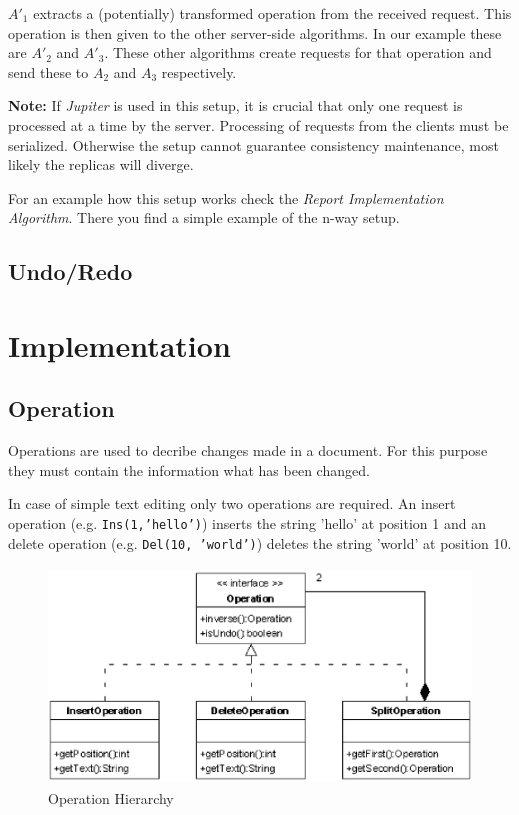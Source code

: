 $A'_1$ extracts a (potentially) transformed operation from the received 
request. This operation is then given to the other server-side algorithms. 
In our example these are $A'_2$ and $A'_3$. These other algorithms create
requests for that operation and send these to $A_2$ and $A_3$ respectively.

\textbf{Note:} If \emph{Jupiter} is used in this setup, it is crucial that
only one request is processed at a time by the server. Processing of
requests from the clients must be serialized. Otherwise the setup cannot
guarantee consistency maintenance, most likely the replicas will diverge.

For an example how this setup works check the 
\emph{Report Implementation Algorithm}. There you find a simple example
of the n-way setup.


\subsection{Undo/Redo}
\label{sect:algorithm.undoredo}
% 
%



\section{Implementation}


\subsection{Operation}
Operations are used to decribe changes made in a document. For this purpose they 
must contain the information what has been changed.

In case of simple text editing only two operations are required. An insert 
operation (e.g. \texttt{Ins(1,'hello')}) inserts the string 'hello' at position 
1 and an delete operation (e.g. \texttt{Del(10, 'world')}) deletes the string 
'world' at position 10.

\begin{figure}[H]
\centering
\includegraphics[height=5.74cm,width=11.59cm]{../images/finalreport/algorithm_operation.eps}
\caption{Operation Hierarchy}
\label{Operation Hierarchy}
\end{figure}

